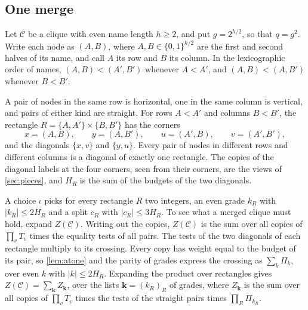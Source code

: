\documentclass[11pt]{article}
\theoremstyle{definition}
\theoremstyle{definition}
\theoremstyle{remark}
\begin{document}
\subsection{One merge}\label{sec:merge}

Let $\mathcal C$ be a clique with even name length $h\ge2$, and put $g=2^{h/2}$, so that $q=g^2$. Write each node as $(A,B)$, where $A,B\in\{0,1\}^{h/2}$ are the first and second halves of its name, and call $A$ its row and $B$ its column. In the lexicographic order of names, $(A,B)<(A',B')$ whenever $A<A'$, and $(A,B)<(A,B')$ whenever $B<B'$.

A pair of nodes in the same row is horizontal, one in the same column is vertical, and pairs of either kind are straight. For rows $A<A'$ and columns $B<B'$, the rectangle $R=\{A,A'\}\times\{B,B'\}$ has the corners
\[
x=(A,B),\qquad y=(A,B'),\qquad u=(A',B),\qquad v=(A',B'),
\]
and the diagonals $\{x,v\}$ and $\{y,u\}$. Every pair of nodes in different rows and different columns is a diagonal of exactly one rectangle. The copies of the diagonal labels at the four corners, seen from their corners, are the views of \cref{sec:pieces}, and $H_R$ is the sum of the budgets of the two diagonals.

A choice $\iota$ picks for every rectangle $R$ two integers, an even grade $k_R$ with $|k_R|\le2H_R$ and a split $c_R$ with $|c_R|\le3H_R$. To see what a merged clique must hold, expand $Z(\mathcal C)$. Writing out the copies, $Z(\mathcal C)$ is the sum over all copies of $\prod_vT_v$ times the equality tests of all pairs. The tests of the two diagonals of each rectangle multiply to its crossing. Every copy has weight equal to the budget of its pair, so \cref{lem:atone} and the parity of grades express the crossing as $\sum_k\Pi_k$, over even $k$ with $|k|\le2H_R$. Expanding the product over rectangles gives $Z(\mathcal C)=\sum_{\mathbf k}Z_{\mathbf k}$, over the lists $\mathbf k=(k_R)_R$ of grades, where $Z_{\mathbf k}$ is the sum over all copies of $\prod_vT_v$ times the tests of the straight pairs times $\prod_R\Pi_{k_R}$.
\end{document}
